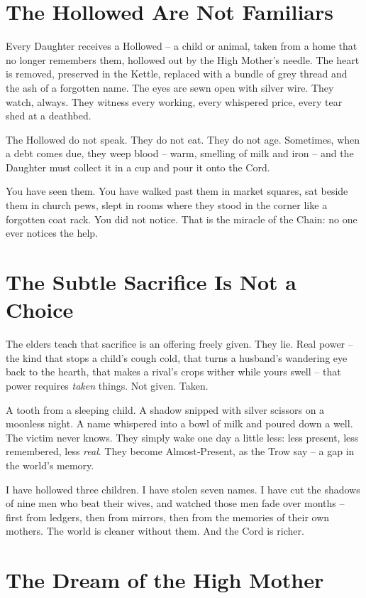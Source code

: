 \documentclass[10pt,a5paper]{book}
\begin{document}
\section*{The Hollowed Are Not Familiars}

Every Daughter receives a Hollowed -- a child or animal, taken from a home that no longer remembers them, hollowed out by the High Mother's needle. The heart is removed, preserved in the Kettle, replaced with a bundle of grey thread and the ash of a forgotten name. The eyes are sewn open with silver wire. They watch, always. They witness every working, every whispered price, every tear shed at a deathbed.

The Hollowed do not speak. They do not eat. They do not age. Sometimes, when a debt comes due, they weep blood -- warm, smelling of milk and iron -- and the Daughter must collect it in a cup and pour it onto the Cord.

You have seen them. You have walked past them in market squares, sat beside them in church pews, slept in rooms where they stood in the corner like a forgotten coat rack. You did not notice. That is the miracle of the Chain: no one ever notices the help.

\section*{The Subtle Sacrifice Is Not a Choice}

The elders teach that sacrifice is an offering freely given. They lie. Real power -- the kind that stops a child's cough cold, that turns a husband's wandering eye back to the hearth, that makes a rival's crops wither while yours swell -- that power requires \textit{taken} things. Not given. Taken.

A tooth from a sleeping child. A shadow snipped with silver scissors on a moonless night. A name whispered into a bowl of milk and poured down a well. The victim never knows. They simply wake one day a little less: less present, less remembered, less \textit{real}. They become Almost‑Present, as the Trow say -- a gap in the world's memory.

I have hollowed three children. I have stolen seven names. I have cut the shadows of nine men who beat their wives, and watched those men fade over months -- first from ledgers, then from mirrors, then from the memories of their own mothers. The world is cleaner without them. And the Cord is richer.

\section*{The Dream of the High Mother}
\end{document}
